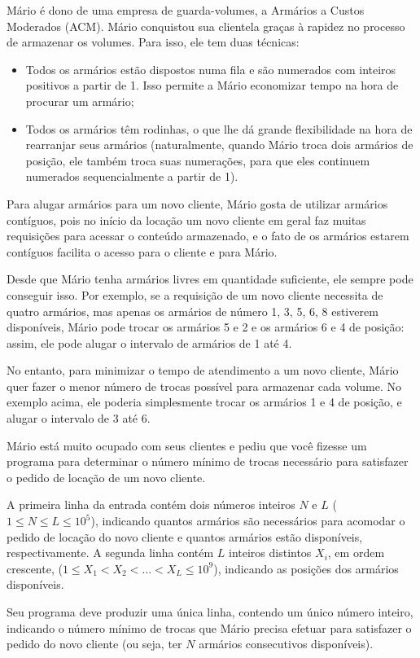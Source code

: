 
%
%
%

Mário é dono de uma empresa de guarda-volumes, a Armários a Custos Moderados (ACM). Mário conquistou sua clientela graças à rapidez no processo de armazenar os volumes. Para isso, ele tem duas técnicas:
\begin{itemize}
	\item Todos os armários estão dispostos numa fila e são numerados com inteiros positivos a partir de 1. Isso permite a Mário economizar tempo na hora de procurar um armário;
	\item Todos os armários têm rodinhas, o que lhe dá grande flexibilidade na hora de rearranjar seus armários (naturalmente, quando Mário troca dois armários de posição, ele também troca suas numerações, para que eles continuem numerados sequencialmente a partir de 1).
\end{itemize}

Para alugar armários para um novo cliente, Mário gosta de utilizar armários contíguos, pois no início da locação um novo cliente em geral faz muitas requisições para acessar o conteúdo armazenado,
e o fato de os armários estarem contíguos facilita o acesso para o cliente e para Mário.

Desde que Mário tenha armários livres em quantidade suficiente, ele sempre pode conseguir isso. Por exemplo, se a requisição de um novo cliente necessita de quatro armários, mas apenas os armários de número 1, 3, 5, 6, 8 estiverem disponíveis, Mário pode trocar os armários 5 e 2 e os armários 6 e 4 de posição: assim, ele pode alugar o intervalo de armários de 1 até 4.

No entanto, para minimizar o tempo de atendimento a um novo cliente, Mário quer fazer o menor número de trocas possível para armazenar cada volume. No exemplo acima, ele poderia simplesmente trocar os armários 1 e 4 de posição, e alugar o intervalo de 3 até 6.

Mário está muito ocupado com seus clientes e pediu que você fizesse um programa para determinar o número mínimo de trocas necessário para satisfazer o pedido de locação de um novo cliente.

\Entrada%
A primeira linha da entrada contém dois números inteiros $N$ e $L$ \mbox{($1 \leq N \leq L \leq 10^5$)}, indicando quantos armários são necessários para acomodar o pedido de locação do novo cliente e quantos armários estão
disponíveis, respectivamente. A segunda linha contém $L$ inteiros distintos $X_i $, em ordem crescente, ($1 \leq X_1 < X_2 < \dots < X_L \leq 10^9$), indicando as posições dos armários disponíveis.

\Saida%
Seu programa deve produzir uma única linha, contendo um único número inteiro, indicando o número mínimo de trocas que Mário precisa efetuar para satisfazer o pedido do novo cliente (ou seja, ter $N$ armários consecutivos disponíveis).

%
